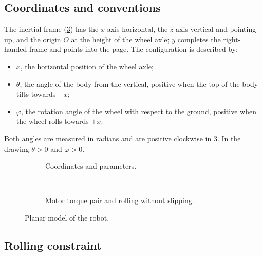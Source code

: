 \subsection{Coordinates and conventions}

The inertial frame (\cref{fig:model}) has the $x$ axis horizontal, the $z$
axis vertical and pointing up, and the origin $O$ at the height of the wheel
axle; $y$ completes the right-handed frame and points into the page. The
configuration is described by:
\begin{itemize}
  \item $x$, the horizontal position of the wheel axle;
  \item $\theta$, the angle of the body from the vertical, positive when the
        top of the body tilts towards $+x$;
  \item $\varphi$, the rotation angle of the wheel with respect to the ground,
        positive when the wheel rolls towards $+x$.
\end{itemize}
Both angles are measured in radians and are positive clockwise in
\cref{fig:model}. In the drawing $\theta>0$ and $\varphi>0$.

\begin{figure}[h]
\centering
\begin{subfigure}[b]{\linewidth}
  \centering
  \caption{Coordinates and parameters.}
  \label{fig:model-kin}
\end{subfigure}\\[1em]
\begin{subfigure}[b]{\linewidth}
  \centering
  \caption{Motor torque pair and rolling without slipping.}
  \label{fig:model-act}
\end{subfigure}
\caption{Planar model of the robot.}
\label{fig:model}
\end{figure}

\subsection{Rolling constraint}

